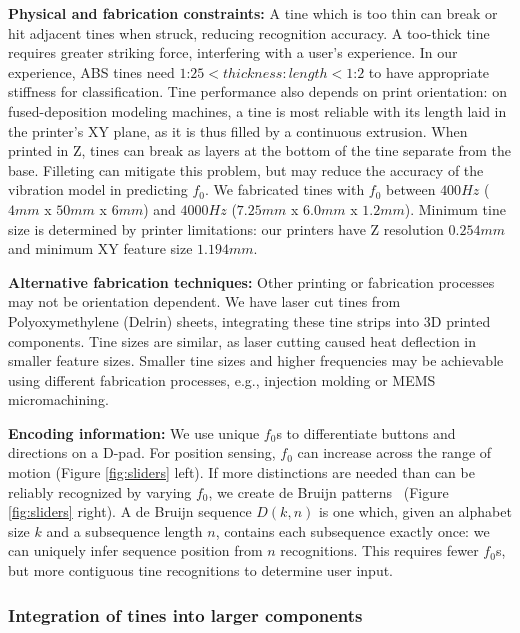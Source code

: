             \textbf{Physical and fabrication constraints:} A tine which is too thin can break or hit adjacent tines when struck, reducing recognition accuracy.  A too-thick tine requires greater striking force, interfering with a user's experience.
In our experience, ABS tines need $1$:$25 < thickness:length < 1$:$2$ to have appropriate stiffness for classification.  Tine performance also depends on print orientation: on fused-deposition modeling machines, a tine is most reliable with its length laid in the printer's XY plane, as it is thus filled by a continuous extrusion.  
When printed in Z, tines can break as layers at the bottom of the tine separate from the base.
Filleting can mitigate this problem, but may reduce the accuracy of the vibration model in predicting $f_0$.  We fabricated tines with $f_0$ between $400Hz$ ($4mm$ x $50mm$ x $6mm$) and $4000Hz$ ($7.25mm$ x $6.0mm$ x $1.2mm$).  
Minimum tine size is determined by printer limitations: our printers have Z resolution $0.254mm$ and minimum XY feature size $1.194mm$.

            \textbf{Alternative fabrication techniques:} Other printing or fabrication processes may not be orientation dependent. We have laser cut tines from Polyoxymethylene (Delrin) sheets, integrating these tine strips into 3D printed components.  Tine sizes are similar, as laser cutting caused heat deflection in smaller feature sizes. Smaller tine sizes and higher frequencies may be achievable using different fabrication processes, e.g., injection molding or MEMS micromachining.

            \textbf{Encoding information:} We use unique $f_0$s to differentiate buttons and directions on a D-pad. For position sensing, $f_0$ can increase across the range of motion (Figure \ref{fig:sliders} left). If more distinctions are needed than can be reliably recognized by varying $f_0$, we create de Bruijn patterns~\cite{DeBruijn-seqproof} (Figure \ref{fig:sliders} right).  A de Bruijn sequence $D(k,n)$ is one which, given an alphabet size $k$ and a subsequence length $n$, contains each subsequence exactly once: we can uniquely infer sequence position from $n$ recognitions.
This requires fewer $f_0$s, but more contiguous tine recognitions to determine user input.

        \subsubsection{Integration of tines into larger components}

